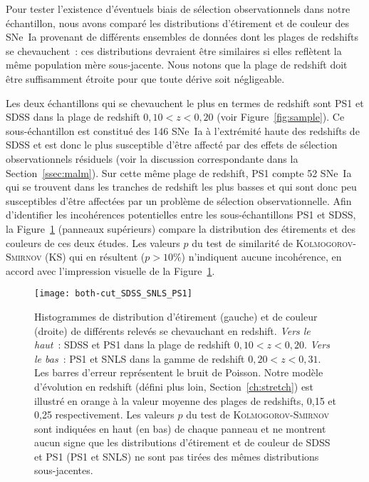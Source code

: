 \documentclass[../main/main.tex]{subfiles}
\begin{document}
Pour tester l'existence d'éventuels biais de sélection observationnels dans
notre échantillon, nous avons comparé les distributions d'étirement et de couleur
des SNe~Ia provenant de différents ensembles de données dont les plages de
redshifts se chevauchent~: ces distributions devraient être similaires si elles
reflètent la même population mère sous-jacente. Nous notons que la plage de
redshift doit être suffisamment étroite pour que toute dérive soit négligeable.

Les deux échantillons qui se chevauchent le plus en termes de redshift sont PS1
et SDSS dans la plage de redshift $0,10 < z < 0,20$ (voir
Figure~\ref{fig:sample}). Ce sous-échantillon est constitué des 146 SNe~Ia à
l'extrémité haute des redshifts de SDSS et est donc le plus susceptible d'être
affecté par des effets de sélection observationnels résiduels (voir la
discussion correspondante dans la Section~\ref{ssec:malm}). Sur cette même plage
de redshift, PS1 compte 52 SNe~Ia qui se trouvent dans les tranches de redshift
les plus basses et qui sont donc peu susceptibles d'être affectées par un
problème de sélection observationnelle. Afin d'identifier les incohérences
potentielles entre les sous-échantillons PS1 et SDSS, la Figure~\ref{fig:testvl}
(panneaux supérieurs) compare la distribution des étirements et des couleurs de
ces deux études. Les valeurs $p$ du test de similarité de
\textsc{Kolmogorov-Smirnov} (KS) qui en résultent ($p > 10\%$) n'indiquent
aucune incohérence, en accord avec l'impression visuelle de la
Figure~\ref{fig:testvl}.

\begin{figure}[ht]
    \centering
    \texttt{[image: both-cut\_SDSS\_SNLS\_PS1]}
    \caption[Histogrammes de test de similarité de \textsc{Kolmogorov-Smirnov}
    entre les sondages SDSS et PS1 d'une part, PS1 et SNLS d'autre par, en
    étirement et en couleur]{Histogrammes de distribution d'étirement (gauche) et
        de couleur (droite) de différents relevés se chevauchant en redshift.
        \textit{Vers le haut}~: SDSS et PS1 dans la plage de redshift $0,10 < z
        < 0,20$. \textit{Vers le bas}~: PS1 et SNLS dans la gamme de redshift
        $0,20 < z < 0,31$. Les barres d'erreur représentent le bruit de Poisson.
        Notre modèle d'évolution en redshift (défini plus loin,
        Section~\ref{ch:stretch}) est illustré en orange à la valeur moyenne des
        plages de redshifts, 0,15 et 0,25 respectivement. Les valeurs $p$ du
        test de \textsc{Kolmogorov-Smirnov} sont indiquées en haut (en bas) de
        chaque panneau et ne montrent aucun signe que les distributions
        d'étirement et de couleur de SDSS et PS1 (PS1 et SNLS) ne sont pas
    tirées des mêmes distributions sous-jacentes.}
    \label{fig:testvl}
\end{figure}
\end{document}
